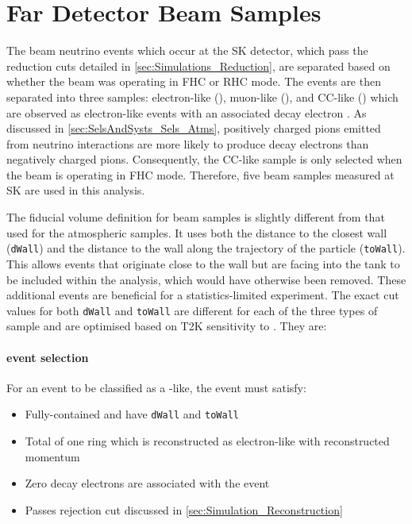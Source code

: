 \section{Far Detector Beam Samples}
\label{sec:SelsAndSysts_Sels_FD}

The beam neutrino events which occur at the SK detector, which pass the reduction cuts detailed in \autoref{sec:Simulations_Reduction}, are separated based on whether the beam was operating in FHC or RHC mode. The events are then separated into three samples: electron-like (), muon-like (), and CC\quickmath{1\pi^{+}}-like () which are observed as electron-like events with an associated decay electron \cite{t2k_tn_399}. As discussed in \autoref{sec:SelsAndSysts_Sels_Atms}, positively charged pions emitted from neutrino interactions are more likely to produce decay electrons than negatively charged pions. Consequently, the CC\quickmath{1\pi^{+}}-like sample is only selected when the beam is operating in FHC mode. Therefore, five beam samples measured at SK are used in this analysis.

The fiducial volume definition for beam samples is slightly different from that used for the atmospheric samples.  It uses both the distance to the closest wall (\texttt{dWall}) and the distance to the wall along the trajectory of the particle (\texttt{toWall}). This allows events that originate close to the wall but are facing into the tank to be included within the analysis, which would have otherwise been removed. These additional events are beneficial for a statistics-limited experiment. The exact cut values for both \texttt{dWall} and \texttt{toWall} are different for each of the three types of sample and are optimised based on T2K sensitivity to \dcp \cite{t2k_tn_318, t2k_tn_319}. They are:

\paragraph{ event selection}

For an event to be classified as a -like, the event must satisfy:

\begin{itemize}
\item Fully-contained and have \texttt{dWall}  and \texttt{toWall} 
\item Total of one ring which is reconstructed as electron-like with reconstructed momentum 
\item Zero decay electrons are associated with the event
\item Passes  rejection cut discussed in \autoref{sec:Simulation_Reconstruction}
\end{itemize}

